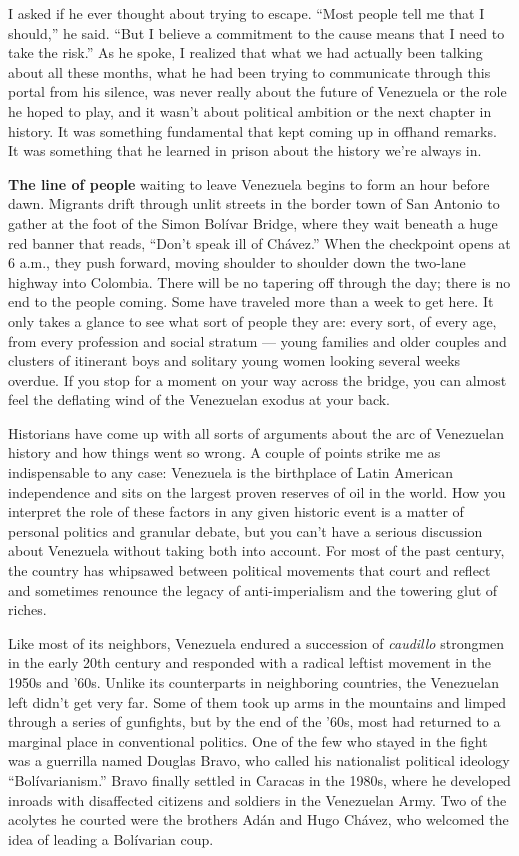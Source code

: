 I asked if he ever thought about trying to escape. ``Most people tell me
that I should,'' he said. ``But I believe a commitment to the cause
means that I need to take the risk.'' As he spoke, I realized that what
we had actually been talking about all these months, what he had been
trying to communicate through this portal from his silence, was never
really about the future of Venezuela or the role he hoped to play, and
it wasn't about political ambition or the next chapter in history. It
was something fundamental that kept coming up in offhand remarks. It was
something that he learned in prison about the history we're always in.

\textbf{The line of people} waiting to leave Venezuela begins to form an
hour before dawn. Migrants drift through unlit streets in the border
town of San Antonio to gather at the foot of the Simon Bolívar Bridge,
where they wait beneath a huge red banner that reads, ``Don't speak ill
of Chávez.'' When the checkpoint opens at 6 a.m., they push forward,
moving shoulder to shoulder down the two-lane highway into Colombia.
There will be no tapering off through the day; there is no end to the
people coming. Some have traveled more than a week to get here. It only
takes a glance to see what sort of people they are: every sort, of every
age, from every profession and social stratum --- young families and
older couples and clusters of itinerant boys and solitary young women
looking several weeks overdue. If you stop for a moment on your way
across the bridge, you can almost feel the deflating wind of the
Venezuelan exodus at your back.

Historians have come up with all sorts of arguments about the arc of
Venezuelan history and how things went so wrong. A couple of points
strike me as indispensable to any case: Venezuela is the birthplace of
Latin American independence and sits on the largest proven reserves of
oil in the world. How you interpret the role of these factors in any
given historic event is a matter of personal politics and granular
debate, but you can't have a serious discussion about Venezuela without
taking both into account. For most of the past century, the country has
whipsawed between political movements that court and reflect and
sometimes renounce the legacy of anti-imperialism and the towering glut
of riches.

Like most of its neighbors, Venezuela endured a succession of
\emph{caudillo} strongmen in the early 20th century and responded with a
radical leftist movement in the 1950s and '60s. Unlike its counterparts
in neighboring countries, the Venezuelan left didn't get very far. Some
of them took up arms in the mountains and limped through a series of
gunfights, but by the end of the '60s, most had returned to a marginal
place in conventional politics. One of the few who stayed in the fight
was a guerrilla named Douglas Bravo, who called his nationalist
political ideology ``Bolívarianism.'' Bravo finally settled in Caracas
in the 1980s, where he developed inroads with disaffected citizens and
soldiers in the Venezuelan Army. Two of the acolytes he courted were the
brothers Adán and Hugo Chávez, who welcomed the idea of leading a
Bolívarian coup.

